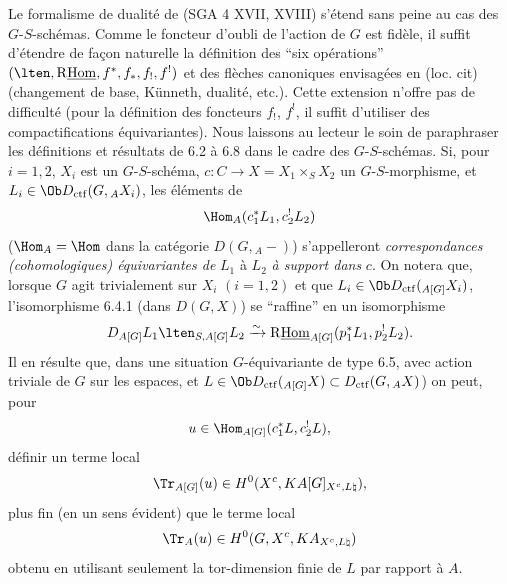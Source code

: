 Le formalisme de dualité de (SGA 4 XVII, XVIII) s'étend sans peine au cas des $G$-$S$-schémas. Comme le foncteur d'oubli de l'action de $G$ est fidèle, il suffit d'étendre de façon naturelle la définition des ``six opérations'' $(\lten,\mathrm{R}\underline{\mathrm{Hom}},f^*,f_*,f_!,f^!)$ et des flèches canoniques envisagées en (loc. cit) (changement de base, Künneth, dualité, etc.). Cette extension n'offre pas de difficulté (pour la définition des foncteurs $f_!$, $f^!$, il suffit d'utiliser des compactifications équivariantes). Nous laissons au lecteur le soin de paraphraser les définitions et résultats de 6.2 à 6.8 dans le cadre des $G$-$S$-schémas. Si, pour $i=1,2$, $X_i$ est un $G$-$S$-schéma, $c:C\to X=X_1\times_SX_2$ un $G$-$S$-morphisme, et $L_i\in\Ob D_{\mathrm{ctf}}(G,{}_AX_i)$, les éléments de
\[
\Hom_A(c_1^*L_1,c_2^!L_2)
\]
($\Hom_A=\Hom$ dans la catégorie $D(G,{}_A-)$) s'appelleront \emph{correspondances (cohomologiques) équivariantes de} $L_1$ à $L_2$ \emph{à support dans} $c$. On notera que, lorsque $G$ agit trivialement sur $X_i$ $(i=1,2)$ et que $L_i\in\Ob D_{\mathrm{ctf}}({}_{A[G]}X_i)$, l'isomorphisme 6.4.1 (dans $D(G,X)$) se ``raffine'' en un isomorphisme
\[
D_{A[G]}L_1\lten_{S,A[G]}L_2
\xrightarrow{\sim}
\mathrm{R}\underline{\mathrm{Hom}}_{A[G]}(p_1^*L_1,p_2^!L_2).
\]
Il en résulte que, dans une situation $G$-équivariante de type 6.5, avec action triviale de $G$ sur les espaces, et $L\in\Ob D_{\mathrm{ctf}}({}_{A[G]}X)\subset D_{\mathrm{ctf}}(G,{}_AX)$) on peut, pour
\[
u\in\Hom_{A[G]}(c_1^*L,c_2^!L),
\]
définir un terme local
\[
\Tr_{A[G]}(u)\in H^0(X^c,KA[G]_{X^c,L\natural}),
\]
plus fin (en un sens évident) que le terme local
\[
\Tr_A(u)\in H^0(G,X^c,KA_{X^c,L\natural})
\]
obtenu en utilisant seulement la tor-dimension finie de $L$ par rapport à $A$.

